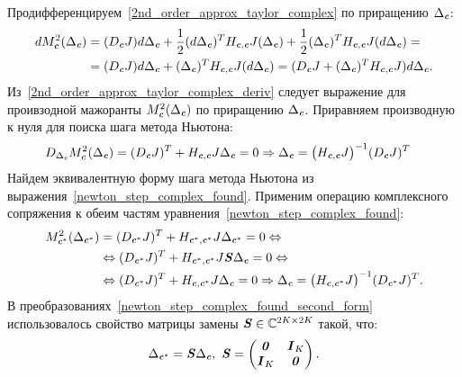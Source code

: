 Продифференцируем~\eqref{2nd_order_approx_taylor_complex} по приращению $\Delta_{\textbf{\textit{c}}}$:
\begin{align}
	dM^2_{\textbf{\textit{c}}}(\Delta_{\textbf{\textit{c}}})&=(D_{\textbf{\textit{c}}}J)d\Delta_{\textbf{\textit{c}}}+
	\frac{1}{2}(d\Delta_{\textbf{\textit{c}}})^T H_{\textbf{\textit{c}},\textbf{\textit{c}} }J(\Delta_{\textbf{\textit{c}}})+
	\frac{1}{2}(\Delta_{\textbf{\textit{c}}})^T H_{\textbf{\textit{c}},\textbf{\textit{c}} }J(d\Delta_{\textbf{\textit{c}}})= \nonumber \\
	&=(D_{\textbf{\textit{c}}}J)d\Delta_{\textbf{\textit{c}}}+(\Delta_{\textbf{\textit{c}}})^T H_{\textbf{\textit{c}},\textbf{\textit{c}}}J(d\Delta_{\textbf{\textit{c}}})=
	(D_{\textbf{\textit{c}}}J+(\Delta_{\textbf{\textit{c}}})^T H_{\textbf{\textit{c}},\textbf{\textit{c}}}J)d\Delta_{\textbf{\textit{c}}}.
	\label{2nd_order_approx_taylor_complex_deriv}
\end{align}
Из~\eqref{2nd_order_approx_taylor_complex_deriv} следует выражение для проивзодной мажоранты $M^2_{\textbf{\textit{c}}}(\Delta_{\textbf{\textit{c}}})$ по приращению $\Delta_{\textbf{\textit{c}}}$. Приравняем производную к нуля для поиска шага метода Ньютона:
\begin{align}
	D_{\Delta_{\textbf{\textit{c}}}}M^2_{\textbf{\textit{c}}}(\Delta_{\textbf{\textit{c}}})&=(D_{\textbf{\textit{c}}}J)^T + H_{\textbf{\textit{c}},\textbf{\textit{c}}}J\Delta_{\textbf{\textit{c}}}=0 \Rightarrow \Delta_{\textbf{\textit{c}}}=\big(H_{\textbf{\textit{c}},\textbf{\textit{c}}}J\big)^{-1}(D_{\textbf{\textit{c}}}J)^T
	\label{newton_step_complex_found}
\end{align}
Найдем эквивалентную форму шага метода Ньютона из выражения~\eqref{newton_step_complex_found}. Применим операцию комплексного сопряжения к обеим частям уравнения~\eqref{newton_step_complex_found}:
\begin{align}
	M^2_{\textbf{\textit{c}}^*}(\Delta_{\textbf{\textit{c}}^*})&=(D_{\textbf{\textit{c}}^*}J)^T + H_{\textbf{\textit{c}}^*,\textbf{\textit{c}}^*}J\Delta_{\textbf{\textit{c}}^*}=0 \Leftrightarrow \nonumber \\
	&\Leftrightarrow (D_{\textbf{\textit{c}}^*}J)^T + H_{\textbf{\textit{c}}^*,\textbf{\textit{c}}^*}J\textbf{\textit{S}}\Delta_{\textbf{\textit{c}}}=0 \Leftrightarrow \nonumber \\
	&	\Leftrightarrow(D_{\textbf{\textit{c}}^*}J)^T + H_{\textbf{\textit{c}},\textbf{\textit{c}}^*}J\Delta_{\textbf{\textit{c}}}=0 \Rightarrow
	\Delta_{\textbf{\textit{c}}}=\big(H_{\textbf{\textit{c}},\textbf{\textit{c}}^*}J\big)^{-1}(D_{\textbf{\textit{c}}^*}J)^T.
	\label{newton_step_complex_found_second_form}
\end{align}
В преобразованиях~\eqref{newton_step_complex_found_second_form} использовалось свойство матрицы замены $\textbf{\textit{S}}\in\mathbb{C}^{2K\times 2K}$ такой, что:
\begin{equation}
	\Delta_{\textbf{\textit{c}}^*}=\textbf{\textit{S}}\Delta_{\textbf{\textit{c}}}, \text{		} \textbf{\textit{S}}=\begin{pmatrix}
		\textbf{\textit{0}} & \textbf{\textit{I}}_K \\
		\textbf{\textit{I}}_K & \textbf{\textit{0}}
	\end{pmatrix}.
	\label{swap_matrix}
\end{equation}

